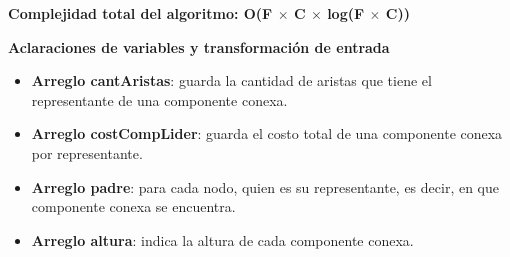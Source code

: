 \textbf{Complejidad total del algoritmo: O(F $\times$ C $\times$ log(F $\times$ C))}

\textbf{Aclaraciones de variables y transformaci\'on de entrada}

\begin{itemize}

\item {\bf Arreglo cantAristas}: guarda la cantidad de aristas que tiene el representante de una componente conexa.
\item {\bf Arreglo costCompLider}: guarda el costo total de una componente conexa por representante. 
\item {\bf Arreglo padre}: para cada nodo, quien es su representante, es decir, en que componente conexa se encuentra.
\item {\bf Arreglo altura}: indica la altura de cada componente conexa.
\end{itemize}  